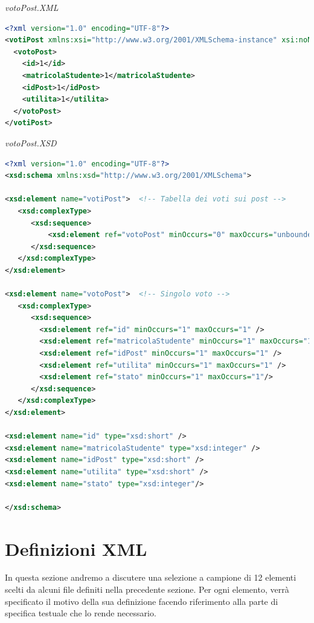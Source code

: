 \documentclass [a4paper,11pt]{book}
\begin{document}
\medskip

\emph{votoPost.XML}

\label{sec:votoPost}

\begin{lstlisting}[language=XML]
<?xml version="1.0" encoding="UTF-8"?>
<votiPost xmlns:xsi="http://www.w3.org/2001/XMLSchema-instance" xsi:noNamespaceSchemaLocation="votoPost.xsd">
  <votoPost>
    <id>1</id>
    <matricolaStudente>1</matricolaStudente>
    <idPost>1</idPost>
    <utilita>1</utilita>
  </votoPost>
</votiPost>
\end{lstlisting}

\emph{votoPost.XSD}

\begin{lstlisting}[language=XML]
<?xml version="1.0" encoding="UTF-8"?>
<xsd:schema xmlns:xsd="http://www.w3.org/2001/XMLSchema">

<xsd:element name="votiPost">  <!-- Tabella dei voti sui post -->
   <xsd:complexType> 
      <xsd:sequence>
	      <xsd:element ref="votoPost" minOccurs="0" maxOccurs="unbounded" />
      </xsd:sequence>
   </xsd:complexType>
</xsd:element>

<xsd:element name="votoPost">  <!-- Singolo voto -->
   <xsd:complexType> 
      <xsd:sequence>
        <xsd:element ref="id" minOccurs="1" maxOccurs="1" /> 
        <xsd:element ref="matricolaStudente" minOccurs="1" maxOccurs="1" />
        <xsd:element ref="idPost" minOccurs="1" maxOccurs="1" /> 
        <xsd:element ref="utilita" minOccurs="1" maxOccurs="1" /> 
        <xsd:element ref="stato" minOccurs="1" maxOccurs="1"/>
      </xsd:sequence>
   </xsd:complexType>
</xsd:element>

<xsd:element name="id" type="xsd:short" />
<xsd:element name="matricolaStudente" type="xsd:integer" />
<xsd:element name="idPost" type="xsd:short" />
<xsd:element name="utilita" type="xsd:short" />
<xsd:element name="stato" type="xsd:integer"/>

</xsd:schema>
\end{lstlisting}

\medskip

\section{Definizioni XML}

In questa sezione andremo a discutere una selezione a campione di 12 elementi scelti da alcuni file definiti nella precedente sezione. Per ogni elemento, verrà specificato il motivo della sua definizione facendo riferimento alla parte di specifica testuale che lo rende necessario.
\end{document}
